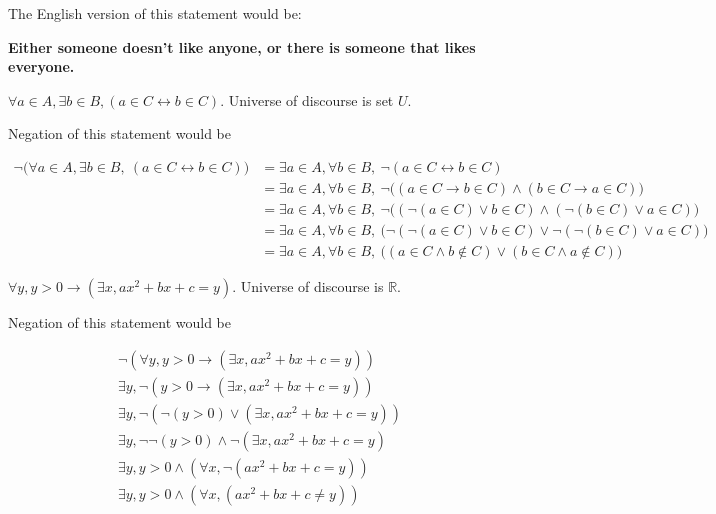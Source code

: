 \documentclass[]{article}
\begin{document}
The English version of this statement would be:

\begin{center}
    \bf{Either someone doesn't like anyone, or there is someone that likes everyone.}
\end{center}


\begin{question}{4}
    $\forall a \in A, \exists b \in B, (a \in C \leftrightarrow b \in C).$ Universe of discourse is set $U$.
\end{question}

Negation of this statement would be

\begin{align*}
\neg \Big( \forall a \in A, \exists b \in B, \ (a \in C \leftrightarrow b \in C) \Big) 
&= \exists a \in A, \forall b \in B, \ \neg (a \in C \leftrightarrow b \in C) \\[2mm]
&= \exists a \in A, \forall b \in B, \ \neg \big( (a \in C \rightarrow b \in C) \land (b \in C \rightarrow a \in C) \big) \\[1mm]
&= \exists a \in A, \forall b \in B, \ \neg \big( (\neg(a \in C) \lor b \in C) \land (\neg(b \in C) \lor a \in C) \big) \\[1mm]
&= \exists a \in A, \forall b \in B, \ \big( \neg(\neg(a \in C) \lor b \in C) \lor \neg(\neg(b \in C) \lor a \in C) \big) \\[1mm]
&= \exists a \in A, \forall b \in B, \ \big( (a \in C \land b \notin C) \lor (b \in C \land a \notin C) \big)
\end{align*}

\begin{question}{5}
    $\forall y, y>0 \rightarrow (\exists x, ax^2 + bx + c = y)$. Universe of discourse is $\mathbb{R}$.
\end{question}

Negation of this statement would be

\begin{align*}
    \neg(\forall y, y>0 \rightarrow (\exists x, ax^2 + bx + c = y)) \\
    \exists y, \neg(y>0 \rightarrow (\exists x, ax^2 + bx + c = y)) \\
    \exists y, \neg(\neg(y>0) \lor (\exists x, ax^2 + bx + c = y)) \\
    \exists y, \neg\neg(y>0) \land \neg(\exists x, ax^2 + bx + c = y) \\
    \exists y, y>0 \land (\forall x, \neg(ax^2 + bx + c = y)) \\
    \exists y, y>0 \land (\forall x, (ax^2 + bx + c \ne y)) \\
\end{align*}
\end{document}
